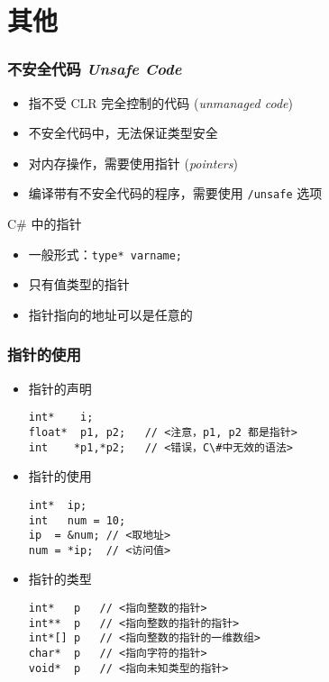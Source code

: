 
\section{其他}

\begin{frame}[fragile]
\frametitle{不安全代码 \textit{Unsafe Code}}

\begin{itemize}
\item 指不受 CLR 完全控制的代码 (\textit{unmanaged code})
\item 不安全代码中，无法保证类型安全
\item 对内存操作，需要使用指针 (\textit{pointers})
\item 编译带有不安全代码的程序，需要使用 \texttt{/unsafe} 选项
\end{itemize}

C\# 中的指针
\begin{itemize}
\item 一般形式：\texttt{type* varname;}
\item 只有值类型的指针
\item 指针指向的地址可以是任意的
\end{itemize}
\end{frame}

\begin{frame}[fragile]
\frametitle{指针的使用}
\begin{itemize}
\item 指针的声明
\begin{lstlisting}[escapeinside=<>]
int*    i;
float*  p1, p2;   // <注意，p1, p2 都是指针>
int    *p1,*p2;   // <错误，C\#中无效的语法>
\end{lstlisting}

\item 指针的使用
\begin{lstlisting}[escapeinside=<>]
int*  ip;
int   num = 10;
ip  = &num; // <取地址>
num = *ip;  // <访问值>
\end{lstlisting}

\item 指针的类型
\begin{lstlisting}[escapeinside=<>]
int*   p   // <指向整数的指针>
int**  p   // <指向整数的指针的指针>
int*[] p   // <指向整数的指针的一维数组>
char*  p   // <指向字符的指针>
void*  p   // <指向未知类型的指针>
\end{lstlisting}
\end{itemize}
\end{frame}


